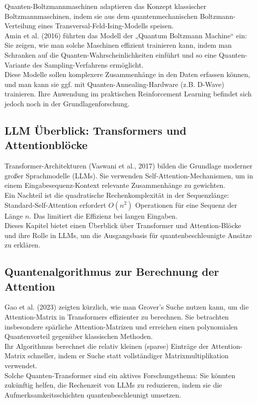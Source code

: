 Quanten-Boltzmannmaschinen adaptieren das Konzept klassischer Boltzmannmaschinen, indem sie aus dem quantenmechanischen Boltzmann-Verteilung eines Transversal-Feld-Ising-Modells speisen.\\
Amin et al. (2016) führten das Modell der „Quantum Boltzmann Machine“ ein: Sie zeigen, wie man solche Maschinen effizient trainieren kann, indem man Schranken auf die Quanten-Wahrscheinlichkeiten einführt und so eine Quanten-Variante des Sampling-Verfahrens ermöglicht.\\
Diese Modelle sollen komplexere Zusammenhänge in den Daten erfassen können, und man kann sie ggf. mit Quanten-Annealing-Hardware (z.B. D-Wave) trainieren. Ihre Anwendung im praktischen Reinforcement Learning befindet sich jedoch noch in der Grundlagenforschung.

\subsection{LLM Überblick: Transformers und Attentionblöcke}

Transformer-Architekturen (Vaswani et al., 2017) bilden die Grundlage moderner großer Sprachmodelle (LLMs). Sie verwenden Self-Attention-Mechanismen, um in einem Eingabesequenz-Kontext relevante Zusammenhänge zu gewichten.\\
Ein Nachteil ist die quadratische Rechenkomplexität in der Sequenzlänge: Standard-Self-Attention erfordert $O(n^2)$ Operationen für eine Sequenz der Länge $n$. Das limitiert die Effizienz bei langen Eingaben.\\
Dieses Kapitel bietet einen Überblick über Transformer und Attention-Blöcke und ihre Rolle in LLMs, um die Ausgangsbasis für quantenbeschleunigte Ansätze zu erklären.

\subsection{Quantenalgorithmus zur Berechnung der Attention}

Gao et al. (2023) zeigten kürzlich, wie man Grover’s Suche nutzen kann, um die Attention-Matrix in Transformers effizienter zu berechnen. Sie betrachten insbesondere spärliche Attention-Matrizen und erreichen einen polynomialen Quantenvorteil gegenüber klassischen Methoden.\\
Ihr Algorithmus berechnet die relativ kleinen (sparse) Einträge der Attention-Matrix schneller, indem er Suche statt vollständiger Matrixmultiplikation verwendet.\\
Solche Quanten-Transformer sind ein aktives Forschungsthema: Sie könnten zukünftig helfen, die Rechenzeit von LLMs zu reduzieren, indem sie die Aufmerksamkeitsschichten quantenbeschleunigt umsetzen.


